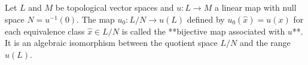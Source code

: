 Let $L$ and $M$ be topological vector spaces and $u: L \to M$ a linear map with null space $N = u^{-1}(0)$. The map $u_0: L/N \to u(L)$ defined by $u_0(\hat{x}) = u(x)$ for each equivalence class $\hat{x} \in L/N$ is called the **bijective map associated with $u$**. It is an algebraic isomorphism between the quotient space $L/N$ and the range $u(L)$.
